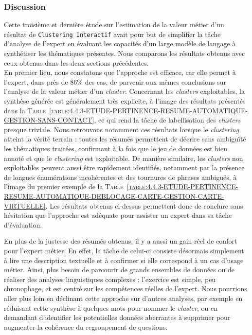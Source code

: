 		\subsubsection{Discussion}
			
			Cette troisième et dernière étude sur l'estimation de la valeur métier d'un résultat de \texttt{Clustering Interactif} avait pour but de simplifier la tâche d'analyse de l'expert en évaluant les capacités d'un large modèle de langage à synthétiser les thématiques présentes.
			Nous comparons les résultats obtenus avec ceux obtenus dans les deux sections précédentes.
			\\
			
			En premier lieu, nous constatons que l'approche est efficace, car elle permet à l'expert, dans près de $86$\% des cas, de parvenir aux mêmes conclusions sur l'analyse de la valeur métier d'un \textit{cluster}.
			Concernant les \textit{clusters} exploitables, la synthèse générée est généralement très explicite, à l'image des résultats présentés dans la \textsc{Table~\ref{table:4.4.3-ETUDE-PERTINENCE-RESUME-AUTOMATIQUE-GESTION-SANS-CONTACT}}, ce qui rend la tâche de labellisation des \textit{clusters} presque triviale.
			Nous retrouvons notamment ces résultats lorsque le \textit{clustering} atteint la vérité terrain : toutes les résumés permettent de décrire sans ambiguïté les thématiques traitées, confirmant à la fois que le jeu de données est bien annoté et que le \textit{clustering} est exploitable.
			De manière similaire, les \textit{clusters} non exploitables peuvent aussi être rapidement identifiés, notamment par la présence de longues énumérations incohérentes et des tournures de phrases ambiguës, à l'image du premier exemple de la \textsc{Table~\ref{table:4.4.3-ETUDE-PERTINENCE-RESUME-AUTOMATIQUE-DEBLOCAGE-CARTE-GESTION-CARTE-VIRTUELLE}}.
			Les résultats obtenus ci-dessus permettent donc de conclure sans hésitation que l'approche est adéquate pour assister un expert dans sa tâche d'évaluation.
			
			En plus de la justesse des résumés obtenus, il y a aussi un gain réel de confort pour l'expert métier.
			En effet, la tâche de celui-ci consiste désormais simplement à lire une description textuelle et à confirmer si elle correspond à un cas d'usage métier.
			Ainsi, plus besoin de parcourir de grands ensembles de données ou de réaliser des analyses linguistiques complexes : l'exercice est simple, peu chronophage, et est centré sur les compétences réelles de l'expert.
			Nous pourrions aller plus loin en déclinant cette approche sur d'autres analyses, par exemple en réduisant cette synthèse à quelques mots pour nommer le \textit{cluster}, ou en demandant d'identifier les potentielles données aberrantes à supprimer pour augmenter la cohérence du regroupement de questions.
			\\
			
